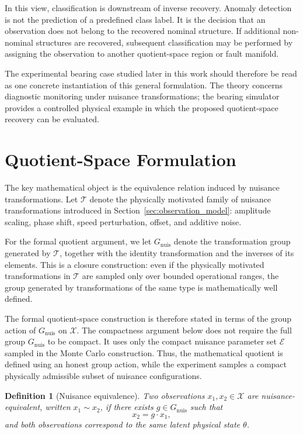 \documentclass[11pt,letterpaper]{article}
\newtheorem{definition}{Definition}
\newcommand{\X}{\ensuremath{\mathcal{X}}}
\newcommand{\EtaSpace}{\ensuremath{\mathcal{E}}}
\newcommand{\Gnuis}{\ensuremath{G_{\mathrm{nuis}}}}
\begin{document}
In this view, classification is downstream of inverse recovery.
Anomaly detection is not the prediction of a predefined class label.
It is the decision that an observation does not belong to the recovered nominal structure.
If additional non-nominal structures are recovered, subsequent classification may be performed by assigning the observation to another quotient-space region or fault manifold.

The experimental bearing case studied later in this work should therefore be read as one concrete instantiation of this general formulation.
The theory concerns diagnostic monitoring under nuisance transformations; the bearing simulator provides a controlled physical example in which the proposed quotient-space recovery can be evaluated.

\section{Quotient-Space Formulation}
\label{sec:quotient_formulation}

The key mathematical object is the equivalence relation induced by nuisance transformations.
Let \(\mathcal{T}\) denote the physically motivated family of nuisance transformations introduced in Section~\ref{sec:observation_model}:
amplitude scaling, phase shift, speed perturbation, offset, and additive noise.

For the formal quotient argument, we let \(\Gnuis\) denote the transformation group generated by \(\mathcal{T}\), together with the identity transformation and the inverses of its elements.
This is a closure construction: even if the physically motivated transformations in \(\mathcal{T}\) are sampled only over bounded operational ranges, the group generated by transformations of the same type is mathematically well defined.

The formal quotient-space construction is therefore stated in terms of the group action of \(\Gnuis\) on \(\X\).
The compactness argument below does not require the full group \(\Gnuis\) to be compact.
It uses only the compact nuisance parameter set \(\EtaSpace\) sampled in the Monte Carlo construction.
Thus, the mathematical quotient is defined using an honest group action, while the experiment samples a compact physically admissible subset of nuisance configurations.
\begin{definition}[Nuisance equivalence]
Two observations \(x_1,x_2 \in \X\) are nuisance-equivalent, written \(x_1 \sim x_2\), if there exists \(g \in \Gnuis\) such that
\begin{equation}
x_2 = g \cdot x_1,
\label{eq:equivalence}
\end{equation}
and both observations correspond to the same latent physical state \(\theta\).
\end{definition}
\end{document}
